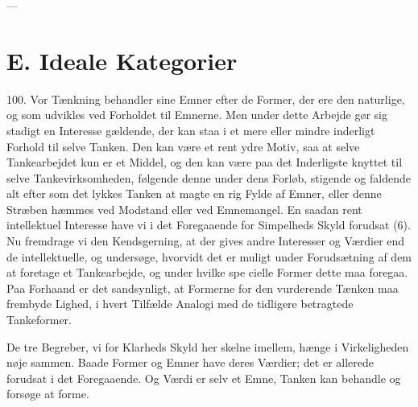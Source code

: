 \documentclass[12pt,a4paper]{book}
\newcommand{\opage}[1]{\marginnote{\footnotesize\textit{[#1]}}}
\begin{document}
\begin{center}---\end{center}

\section*{E. Ideale Kategorier}
\label{sec:ideale-kategorier}

100. Vor Tænkning behandler sine Emner efter de Former, der ere den naturlige, og
som udvikles ved Forholdet til Emnerne. Men under dette Arbejde gør sig stadigt en
Interesse gældende, der kan staa i et mere eller mindre inderligt Forhold til
selve Tanken. Den kan være et rent ydre Motiv, saa at selve Tankearbejdet kun er
et Middel, og den kan være paa det Inderligste knyttet til selve
Tankevirksomheden, følgende denne under dens Forløb, stigende og faldende alt
efter som det lykkes Tanken at magte en rig Fylde af Emner, eller denne Stræben
hæmmes ved Modstand eller ved Emnemangel. En saadan rent intellektuel Interesse
have vi i det Foregaaende for Simpelheds Skyld forudsat (6). Nu fremdrage vi den
Kendsgerning, at der gives andre Interesser og Værdier end de intellektuelle, og
undersøge, hvorvidt det er muligt under Forudsætning af dem at foretage et
Tankearbejde, og under hvilke spe%
\opage{238}cielle Former dette maa foregaa. Paa Forhaand er
det sandsynligt, at Formerne for den vurderende Tænken maa frembyde Lighed, i
hvert Tilfælde Analogi med de tidligere betragtede Tankeformer.

De tre Begreber, vi for Klarheds Skyld her skelne imellem, hænge i Virkeligheden
nøje sammen. Baade Former og Emner have deres Værdier; det er allerede forudsat i
det Foregaaende. Og Værdi er selv et Emne, Tanken kan behandle og forsøge at
forme.
\end{document}
